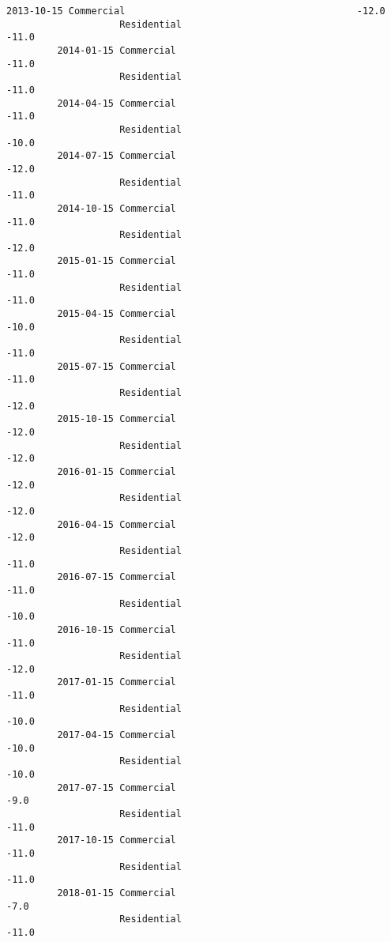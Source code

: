 \documentclass[11pt]{article}
\begin{document}
\begin{Verbatim}[commandchars=\\\{\}]
         2013-10-15 Commercial                                         -12.0   
                    Residential                                        -11.0   
         2014-01-15 Commercial                                         -11.0   
                    Residential                                        -11.0   
         2014-04-15 Commercial                                         -11.0   
                    Residential                                        -10.0   
         2014-07-15 Commercial                                         -12.0   
                    Residential                                        -11.0   
         2014-10-15 Commercial                                         -11.0   
                    Residential                                        -12.0   
         2015-01-15 Commercial                                         -11.0   
                    Residential                                        -11.0   
         2015-04-15 Commercial                                         -10.0   
                    Residential                                        -11.0   
         2015-07-15 Commercial                                         -11.0   
                    Residential                                        -12.0   
         2015-10-15 Commercial                                         -12.0   
                    Residential                                        -12.0   
         2016-01-15 Commercial                                         -12.0   
                    Residential                                        -12.0   
         2016-04-15 Commercial                                         -12.0   
                    Residential                                        -11.0   
         2016-07-15 Commercial                                         -11.0   
                    Residential                                        -10.0   
         2016-10-15 Commercial                                         -11.0   
                    Residential                                        -12.0   
         2017-01-15 Commercial                                         -11.0   
                    Residential                                        -10.0   
         2017-04-15 Commercial                                         -10.0   
                    Residential                                        -10.0   
         2017-07-15 Commercial                                          -9.0   
                    Residential                                        -11.0   
         2017-10-15 Commercial                                         -11.0   
                    Residential                                        -11.0   
         2018-01-15 Commercial                                          -7.0   
                    Residential                                        -11.0   
         

\end{Verbatim}
\end{document}
